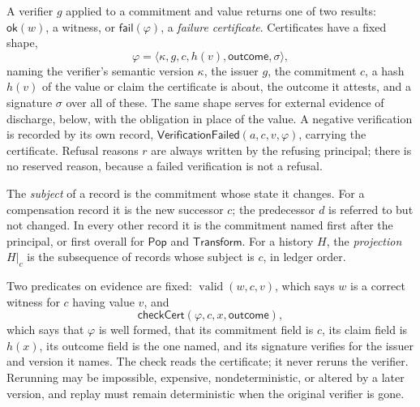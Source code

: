 \documentclass[11pt,openany]{book}
\theoremstyle{remark}
\newcommand{\Pop}{\mathsf{Pop}}
\newcommand{\Transform}{\mathsf{Transform}}
\newcommand{\valid}{\operatorname{valid}}
\begin{document}
A verifier $g$ applied to a commitment and value returns one of two
results: $\mathsf{ok}(w)$, a witness, or $\mathsf{fail}(\varphi)$, a
\emph{failure certificate}. Certificates have a fixed shape,
\[
\varphi=\langle\kappa,g,c,h(v),\mathsf{outcome},\sigma\rangle,
\]
naming the verifier's semantic version $\kappa$, the issuer $g$, the
commitment $c$, a hash $h(v)$ of the value or claim the certificate is
about, the outcome it attests, and a signature $\sigma$ over all of
these. The same shape serves for external evidence of discharge, below,
with the obligation in place of the value. A negative verification is
recorded by its own record, $\mathsf{VerificationFailed}(a,c,v,\varphi)$,
carrying the certificate. Refusal reasons $r$ are always written by the
refusing principal; there is no reserved reason, because a failed
verification is not a refusal.

The \emph{subject} of a record is the commitment whose state it changes.
For a compensation record it is the new successor $c$; the predecessor $d$
is referred to but not changed. In every other record it is the
commitment named first after the principal, or first overall for $\Pop$
and $\Transform$. For a history $H$, the \emph{projection} $H|_c$ is the
subsequence of records whose subject is $c$, in ledger order.

Two predicates on evidence are fixed: $\valid(w,c,v)$, which says $w$ is a
correct witness for $c$ having value $v$, and
\[
\mathsf{checkCert}(\varphi,c,x,\mathsf{outcome}),
\]
which says that $\varphi$ is well formed, that its commitment field is $c$,
its claim field is $h(x)$, its outcome field is the one named, and its
signature verifies for the issuer and version it names. The check reads
the certificate; it never reruns the verifier. Rerunning may be
impossible, expensive, nondeterministic, or altered by a later version,
and replay must remain deterministic when the original verifier is gone.
\end{document}
